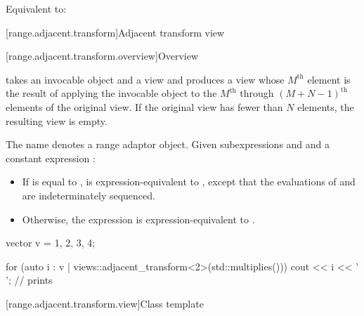 \begin{itemdescr}
\pnum
\effects
Equivalent to: 
\end{itemdescr}

[range.adjacent.transform]{Adjacent transform view}

[range.adjacent.transform.overview]{Overview}

\pnum
{}%
 takes an invocable object and
a view and produces a view
whose $M^\text{th}$ element is the result of applying the invocable object
to the $M^\text{th}$ through $(M + N - 1)^\text{th}$ elements
of the original view.
If the original view has fewer than $N$ elements, the resulting view is empty.

\pnum
{}%
The name  denotes
a range adaptor object.
Given subexpressions  and  and
a constant expression :
\begin{itemize}
\item
If  is equal to ,
 is expression-equivalent to
,
except that the evaluations of  and  are
indeterminately sequenced.
\item
Otherwise,
the expression  is
expression-equivalent to
.
\end{itemize}

\pnum
\begin{example}
\begin{codeblock}
vector v = {1, 2, 3, 4};

for (auto i : v | views::adjacent_transform<2>(std::multiplies())) {
  cout << i << ' ';     // prints 
}
\end{codeblock}
\end{example}

[range.adjacent.transform.view]{Class template }

